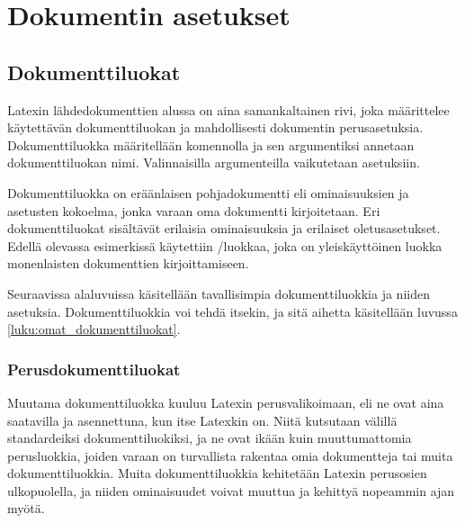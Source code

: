 
\chapter{Dokumentin asetukset}


\section{Dokumenttiluokat}
\label{luku:dokumenttiluokat}

Latexin lähdedokumenttien alussa on aina samankaltainen rivi, joka
määrittelee käytettävän dokumenttiluokan ja mahdollisesti dokumentin
pe\-rus\-ase\-tuk\-sia. Dokumenttiluokka määritellään komennolla
 ja sen argumentiksi annetaan
dokumenttiluokan nimi. Valinnaisilla argumenteilla vaikutetaan
asetuksiin.


Dokumenttiluokka on eräänlaisen pohjadokumentti eli ominaisuuksien ja
asetusten kokoelma, jonka varaan oma dokumentti kirjoitetaan. Eri
dokumenttiluokat sisältävät erilaisia ominaisuuksia ja erilaiset
oletusasetukset. Edellä olevassa esimerkissä käytettiin
\-/luokkaa, joka on yleiskäyttöinen luokka
monenlaisten dokumenttien kirjoittamiseen.

Seuraavissa alaluvuissa käsitellään tavallisimpia dokumenttiluokkia ja
niiden asetuksia. Dokumenttiluokkia voi tehdä itsekin, ja sitä aihetta
käsitellään luvussa \ref{luku:omat_dokumenttiluokat}.

\subsection{Perusdokumenttiluokat}

Muutama dokumenttiluokka kuuluu Latexin perusvalikoimaan, eli ne ovat
aina saatavilla ja asennettuna, kun itse Latexkin on. Niitä kutsutaan
välillä standardeiksi dokumenttiluokiksi, ja ne ovat ikään kuin
muuttumattomia perusluokkia, joiden varaan on turvallista rakentaa omia
dokumentteja tai muita dokumenttiluokkia. Muita dokumenttiluokkia
kehitetään Latexin perusosien ulkopuolella, ja niiden ominaisuudet
voivat muuttua ja kehittyä nopeammin ajan myötä.


